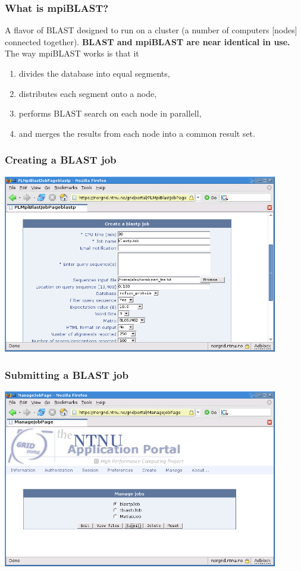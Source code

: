 \documentclass{beamer}
\begin{document}
\begin{frame}
  \frametitle{What is mpiBLAST?}

	A flavor of BLAST designed to run on a cluster (a number of computers [nodes] connected together). {\bf BLAST and mpiBLAST are near identical in use.}\\
	\bigskip
	The way mpiBLAST works is that it
  \begin{enumerate}
  	\item divides the database into equal segments,
  	\item distributes each segment onto a node,
  	\item performs BLAST search on each node in parallell,
  	\item and merges the results from each node into a common result set.
  \end{enumerate}
\end{frame}

\begin{frame}
  \frametitle{Creating a BLAST job}

	\begin{center}
		\includegraphics[width=0.9\textwidth]{gridportal_createblast.png}
	\end{center}
\end{frame}

\begin{frame}
  \frametitle{Submitting a BLAST job}

	\begin{center}
		\includegraphics[width=0.9\textwidth]{gridportal_submitjob.png}
	\end{center}
\end{frame}
\end{document}

